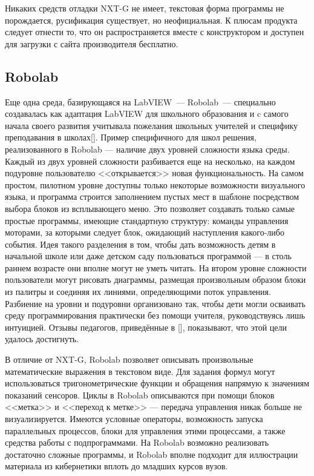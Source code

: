 \documentclass[a5paper]{article}
\begin{document}
Никаких средств отладки NXT-G не имеет, текстовая форма программы не порождается, русификация существует, 
но неофициальная. К плюсам продукта следует отнести то, что он распространяется вместе с конструктором и 
доступен для загрузки с сайта производителя бесплатно.

\subsection{Robolab}

Еще одна среда, базирующаяся на LabVIEW~--- Robolab~--- специально создавалась как адаптация LabVIEW 
для школьного образования и c самого начала своего развития учитывала пожелания школьных учителей и специфику 
преподавания в школах[]. Пример специфичного для школ решения, реализованного в Robolab --- наличие двух уровней 
сложности языка среды. Каждый из двух уровней сложности разбивается еще на несколько, на каждом подуровне пользователю 
<<открывается>> новая функциональность. На самом простом, пилотном уровне доступны только некоторые возможности 
визуального языка, и программа строится заполнением пустых мест в шаблоне посредством выбора блоков из всплывающего 
меню. Это позволяет создавать только самые простые программы, имеющие стандартную структуру: команды управления 
моторами, за которыми следует блок, ожидающий наступления какого-либо события. Идея такого разделения в том, 
чтобы дать возможность детям в начальной школе или даже детском саду пользоваться программой --- в столь раннем 
возрасте они вполне могут не уметь читать. На втором уровне сложности пользователи могут рисовать диаграммы, 
размещая произвольным образом блоки из палитры и соединяя их линиями, определяющими поток управления. Разбиение 
на уровни и подуровни организовано так, чтобы дети могли осваивать среду программирования практически без помощи 
учителя, руководствуясь лишь интуицией. Отзывы педагогов, приведённые в [], показывают, что этой цели удалось достигнуть.

В отличие от NXT-G, Robolab позволяет описывать произвольные математические выражения в текстовом виде. Для 
задания формул могут использоваться тригонометрические функции и обращения напрямую к значениям показаний сенсоров. 
Циклы в Robolab описываются при помощи блоков <<метка>> и <<переход к метке>> --- передача управления никак больше 
не визуализируется. Имеются условные операторы, возможность запуска параллельных процессов, блоки для управления 
этими процессами, а также средства работы с подпрограммами. На Robolab возможно реализовать достаточно сложные 
программы, и Robolab вполне подходит для иллюстрации материала из кибернетики вплоть до младших курсов вузов.
\end{document}
